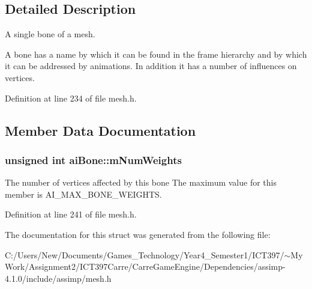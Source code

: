 \subsection{Detailed Description}
A single bone of a mesh. 

A bone has a name by which it can be found in the frame hierarchy and by which it can be addressed by animations. In addition it has a number of influences on vertices. 

Definition at line 234 of file mesh.h.

\subsection{Member Data Documentation}
\hypertarget{structai_bone_87a79d42a0132753aac66397ad6f9b71}{
\subsubsection[mNumWeights]{\setlength{\rightskip}{0pt plus 5cm}unsigned int {\bf aiBone::mNumWeights}}}
\label{structai_bone_87a79d42a0132753aac66397ad6f9b71}


The number of vertices affected by this bone The maximum value for this member is AI\_\-MAX\_\-BONE\_\-WEIGHTS. 

Definition at line 241 of file mesh.h.

The documentation for this struct was generated from the following file:\begin{CompactItemize}
\item 
C:/Users/New/Documents/Games\_\-Technology/Year4\_\-Semester1/ICT397/$\sim$My Work/Assignment2/ICT397Carre/CarreGameEngine/Dependencies/assimp-4.1.0/include/assimp/mesh.h\end{CompactItemize}
